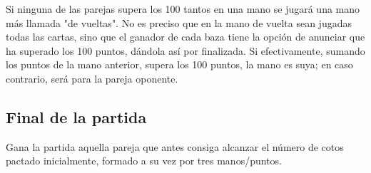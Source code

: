 \documentclass{article}
\begin{document}
Si ninguna de las parejas supera los 100 tantos en una mano se jugará una mano más llamada "de vueltas". No es preciso que en la mano de vuelta sean jugadas todas las cartas, sino que el ganador de cada baza tiene la opción de anunciar que ha superado los 100 puntos, dándola así por finalizada. Si efectivamente, sumando los puntos de la mano anterior, supera los 100 puntos, la mano es suya; en caso contrario, será para la pareja oponente.

\subsection*{Final de la partida}

Gana la partida aquella pareja que antes consiga alcanzar el número de cotos pactado inicialmente, formado a su vez por tres manos/puntos.
\end{document}
